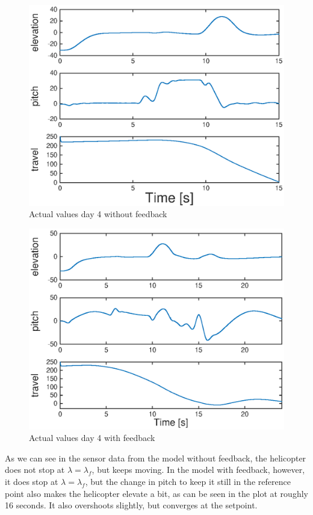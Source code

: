 \begin{figure}[H]
	\centering
	\includegraphics[width=\textwidth]{day4_nofeed}
	\caption{Actual values day 4 without feedback}
	\label{fig:day4nofeed}
\end{figure}


\begin{figure}[H]
	\centering
	\includegraphics[width=\textwidth]{day4_yesfeed}
	\caption{Actual values day 4 with feedback}
	\label{fig:day4yesfeed}
\end{figure}

As we can see in the sensor data from the model without feedback, the helicopter does not stop at $\lambda = \lambda_f$, but keeps moving. In the model with feedback, however, it does stop at $\lambda = \lambda_f$, but the change in pitch to keep it still in the reference point also makes the helicopter elevate a bit, as can be seen in the plot at roughly 16 seconds. It also overshoots slightly, but converges at the setpoint.

